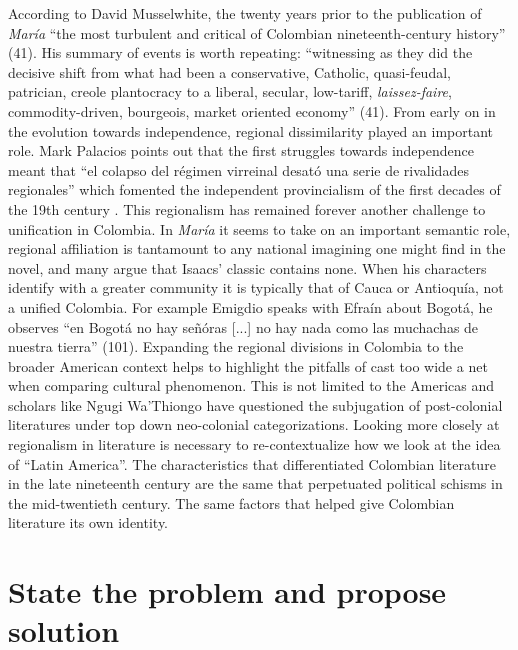 \documentclass[12pt]{report}
\begin{document}
According to David Musselwhite, the twenty years prior to the publication of \textit{María} \enquote{the most turbulent and critical of Colombian nineteenth-century history} \nocite{Musselwhite2006}(41). His summary of events is worth repeating: \enquote{witnessing as they did the decisive shift from what had been a conservative, Catholic, quasi-feudal, patrician, creole plantocracy to a liberal, secular, low-tariff, \textit{laissez-faire}, commodity-driven, bourgeois, market oriented economy} \nocite{Musselwhite2006}(41). From early on in the evolution towards independence, regional dissimilarity played an important role. Mark Palacios points out that the first struggles towards independence meant that \enquote{el colapso del régimen virreinal desató una serie de rivalidades regionales} which fomented the independent provincialism of the first decades of the 19th century \autocite[205]{Palacios2002}. This regionalism has remained forever another challenge to unification in Colombia. In \textit{María} it seems to take on an important semantic role, regional affiliation is tantamount to any national imagining one might find in the novel, and many argue that Isaacs' classic contains none. When his characters identify with a greater community it is typically that of Cauca or Antioquía, not a unified Colombia. For example Emigdio speaks with Efraín about Bogotá, he observes \enquote{en Bogotá no hay señóras [...] no hay nada como las muchachas de nuestra tierra} (101). Expanding the regional divisions in Colombia to the broader American context helps to highlight the pitfalls of cast too wide a net when comparing cultural phenomenon. This is not limited to the Americas and scholars like Ngugi Wa’Thiongo have questioned the subjugation of post-colonial literatures under top down neo-colonial categorizations.
Looking more closely at regionalism in literature is necessary to re-contextualize how we look at the idea of \enquote{Latin America}. 
The characteristics that differentiated Colombian literature in the late nineteenth century are the same that perpetuated political schisms in the mid-twentieth century. The same factors that helped give Colombian literature its own identity. 


\section{State the problem and propose solution}
\end{document}
